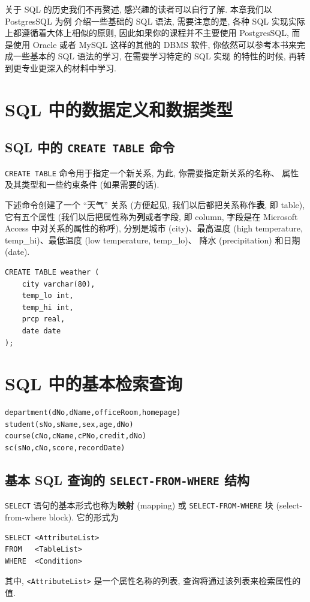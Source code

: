 \documentclass[10pt,UTF8]{book} %
\begin{document}
关于 SQL 的历史我们不再赘述, 感兴趣的读者可以自行了解. 本章我们以 PostgresSQL 为例
介绍一些基础的 SQL 语法, 需要注意的是, 各种 SQL 实现实际上都遵循着大体上相似的原则,
因此如果你的课程并不主要使用 PostgresSQL, 而是使用 Oracle 或者 MySQL 这样的其他的
DBMS 软件, 你依然可以参考本书来完成一些基本的 SQL 语法的学习, 在需要学习特定的 SQL 实现
的特性的时候, 再转到更专业更深入的材料中学习.

\section{SQL 中的数据定义和数据类型}

\subsection{SQL 中的 \lstinline|CREATE TABLE| 命令}

\lstinline|CREATE TABLE| 命令用于指定一个新关系, 为此, 你需要指定新关系的名称、
属性及其类型和一些约束条件 (如果需要的话).

\begin{example} 
    下述命令创建了一个 “天气” 关系 (方便起见, 我们以后都把关系称作\textbf{表}, 即 table),
    它有五个属性 (我们以后把属性称为\textbf{列}或者字段, 即 column, 字段是在
    Microsoft Access 中对关系的属性的称呼), 分别是城市 (city)、最高温度 (high temperature, temp\_hi)、最低温度 (low temperature, temp\_lo)、
    降水 (precipitation) 和日期 (date).
\begin{lstlisting}
CREATE TABLE weather (
    city varchar(80),
    temp_lo int,
    temp_hi int,
    prcp real,
    date date
);
\end{lstlisting}
\end{example}

\section{SQL 中的基本检索查询}

\begin{lstlisting}
department(dNo,dName,officeRoom,homepage)
student(sNo,sName,sex,age,dNo)
course(cNo,cName,cPNo,credit,dNo)
sc(sNo,cNo,score,recordDate)
\end{lstlisting}


\subsection{基本 SQL 查询的 \lstinline|SELECT-FROM-WHERE| 结构}

\lstinline|SELECT| 语句的基本形式也称为\textbf{映射} (mapping) 或
\lstinline|SELECT-FROM-WHERE| 块 (select-from-where block). 它的形式为
\begin{lstlisting}
SELECT <AttributeList>
FROM   <TableList>
WHERE  <Condition>
\end{lstlisting}
其中, \lstinline|<AttributeList>| 是一个属性名称的列表, 查询将通过该列表来检索属性的值.
\end{document}

